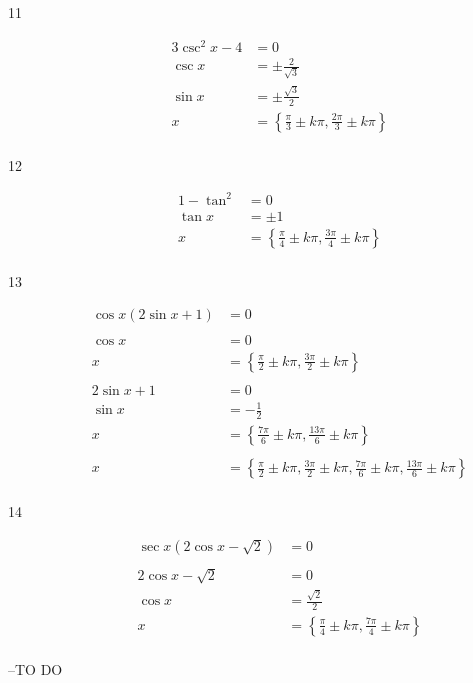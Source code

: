 \documentclass{exam}
\begin{document}
\begin{description}
      \item[11] 
        \begin{align*}
          3 \csc^2 x - 4 & = 0 \\
          \csc x         & = \pm \frac{2}{\sqrt{3}} \\
          \sin x         & = \pm \frac{\sqrt{3}}{2} \\
          x              & = \boxed{ \left\{ \frac{\pi}{3} \pm k \pi, \frac{2 \pi}{3} \pm k \pi \right\} } \\
        \end{align*}

      \item[12] 
        \begin{align*}
          1 - \tan^2 & = 0 \\
          \tan x         & = \pm 1 \\
          x              & = \boxed{ \left\{ \frac{\pi}{4} \pm k \pi, \frac{3 \pi}{4} \pm k \pi \right\} } \\
        \end{align*}

      \item[13] 
        \begin{align*}
          \cos x (2 \sin x + 1) & = 0 \\
          \\
          \cos x & = 0 \\
          x      & = \left\{ \frac{\pi}{2} \pm k \pi, \frac{3 \pi}{2} \pm k \pi \right\} \\
          \\
          2 \sin x + 1 & = 0 \\
          \sin x       & = - \frac{1}{2} \\
          x            & = \left\{ \frac{7 \pi}{6} \pm k \pi, \frac{13 \pi}{6} \pm k \pi \right\} \\
          \\
          x & = \boxed{ \left\{ \frac{\pi}{2} \pm k \pi, \frac{3 \pi}{2} \pm k \pi,
                        \frac{7 \pi}{6} \pm k \pi, \frac{13 \pi}{6} \pm k \pi \right\} } \\
        \end{align*}

      \item[14] 
        \begin{align*}
          \sec x (2 \cos x - \sqrt{2}) & = 0 \\
          \\
          2 \cos x - \sqrt{2} & = 0 \\
          \cos x              & = \frac{\sqrt{2}}{2} \\
          x                   & = \boxed{ \left\{ \frac{\pi}{4} \pm k \pi, \frac{7 \pi}{4} \pm k \pi \right\} } \\
        \end{align*}

    \end{description}

  \else
    \vspace{5 cm}

    \begin{quote}
      \begin{em}
      \end{em}
    \end{quote}
    \hspace{1 cm} --TO DO
  \fi
\end{document}
